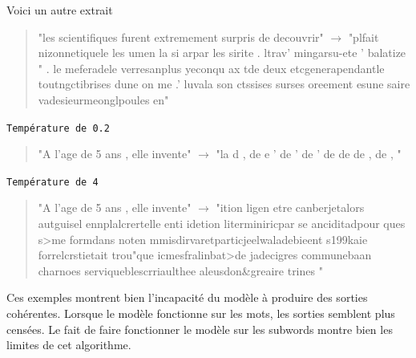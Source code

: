 Voici un autre extrait

  \begin{quotation}
  "les scientifiques furent extremement surpris de decouvrir" $\rightarrow$ "plfait nizonnetiquele les  umen la si arpar les sirite  . ltrav' mingarsu-ete ' balatize  " . le meferadele verresanplus yeconqu ax tde deux  etcgenerapendantle toutngctibrises dune on me  .' luvala son ctssises surses oreement esune saire vadesieurmeonglpoules en"
  \end{quotation}


\noindent{} \texttt{Température de 0.2}

  \begin{quotation}
    
    "A l'age de 5 ans , elle invente" $\rightarrow$ "la d  \hspace{0.3cm},  \hspace{0.3cm}  de   \hspace{0.3cm}  e  \hspace{3cm}                ' de   \hspace{0.6cm}  ' de \hspace{2.7cm}              ' de    \hspace{2cm}     de  \hspace{0.6cm}   de \hspace{0.6cm}   ,  \hspace{0.5cm}         de \hspace{0.3cm}     , \hspace{0.8cm}             "
  \end{quotation}



\noindent{} \texttt{Température de 4}


  \begin{quotation}
  "A l'age de 5 ans , elle invente" $\rightarrow$ "ition ligen etre canberjetalors autguisel ennplalcrertelle enti idetion literminiricpar se anciditadpour ques s>me formdans noten mmisdirvaretparticjeelwaladebieent s199kaie forrelcrstietait trou"que icmesfralinbat>de jadecigres communebaan charnoes serviqueblescrriaulthee aleusdon\&greaire trines "
  \end{quotation}



Ces exemples montrent bien l'incapacité du modèle à produire des sorties
cohérentes. Lorsque le modèle fonctionne sur les mots, les sorties
semblent plus censées. Le fait de faire fonctionner le modèle sur les
subwords montre bien les limites de cet algorithme.

